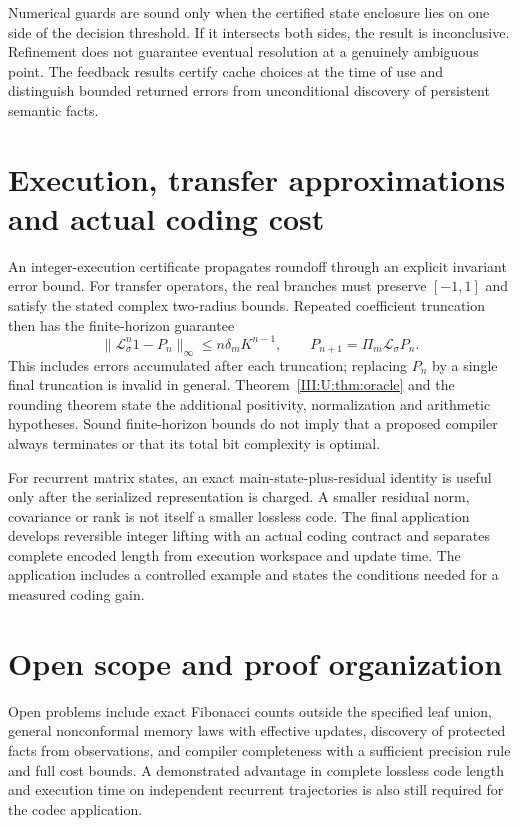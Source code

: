 Numerical guards are sound only when the certified state enclosure lies
on one side of the decision threshold. If it intersects both sides, the
result is inconclusive. Refinement does not guarantee eventual resolution
at a genuinely ambiguous point. The feedback results certify cache
choices at the time of use and distinguish bounded returned errors from
unconditional discovery of persistent semantic facts.

\section{Execution, transfer approximations and actual coding cost}
An integer-execution certificate propagates roundoff through an explicit
invariant error bound. For transfer operators, the real branches must
preserve $[-1,1]$ and satisfy the stated complex two-radius bounds.
Repeated coefficient truncation then has the finite-horizon guarantee
\[
 \|\mathcal L_\sigma^n1-P_n\|_\infty
 \le n\delta_m K^{n-1},
 \qquad P_{n+1}=\Pi_m\mathcal L_\sigma P_n.
\]
This includes errors accumulated after each truncation; replacing
$P_n$ by a single final truncation is invalid in general.
Theorem~\ref{III:U:thm:oracle} and the rounding theorem state the additional
positivity, normalization and arithmetic hypotheses. Sound finite-horizon
bounds do not imply that a proposed compiler always terminates or that
its total bit complexity is optimal.

For recurrent matrix states, an exact main-state-plus-residual identity
is useful only after the serialized representation is charged. A smaller
residual norm, covariance or rank is not itself a smaller lossless code.
The final application develops reversible integer lifting with an actual
coding contract and separates complete encoded length from execution
workspace and update time. The application includes a controlled example
and states the conditions needed for a measured coding gain.

\section{Open scope and proof organization}
Open problems include exact Fibonacci counts outside the specified leaf
union, general nonconformal memory laws with effective updates, discovery
of protected facts from observations, and compiler completeness with a
sufficient precision rule and full cost bounds. A demonstrated advantage
in complete lossless code length and execution time on independent
recurrent trajectories is also still required for the codec application.


